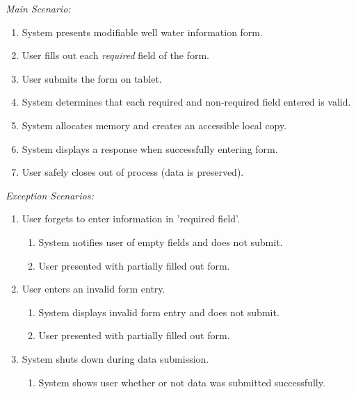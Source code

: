 \documentclass[twoside,letterpaper]{article}
\begin{document}
{\color{black} \textit{Main Scenario:}}
\begin{enumerate}
\item System presents modifiable well water information form.

\item User fills out each \textit{required} field of the form.

\item User submits the form on tablet.

\item System determines that each required and non-required field entered is valid.

\item System allocates memory and creates an accessible local copy.

\item System displays a response when successfully entering form.

\item User safely closes out of process (data is preserved).
\end{enumerate}

{\color{black} \textit{Exception Scenarios:}}
\begin{enumerate}
\item User forgets to enter information in 'required field'.
\begin{enumerate}
\item System notifies user of empty fields and does not submit.
\item User presented with partially filled out form.
\end{enumerate}

\item User enters an invalid form entry.
\begin{enumerate}
\item System displays invalid form entry and does not submit.
\item User presented with partially filled out form.
\end{enumerate}

\item System shuts down during data submission.
\begin{enumerate}
\item System shows user whether or not data was submitted successfully.
\end{enumerate}
\end{enumerate}
\end{document}
